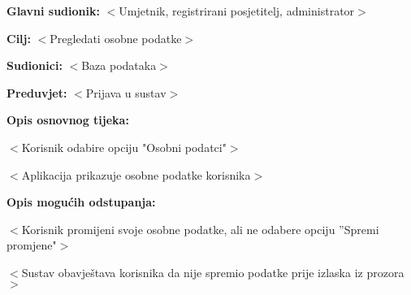 						\noindent {}
						\begin{packed_item}
							
							\item \textbf{Glavni sudionik: }$<$Umjetnik, registrirani posjetitelj, administrator$>$
							\item  \textbf{Cilj:} $<$Pregledati osobne podatke$>$
							\item  \textbf{Sudionici:} $<$Baza podataka$>$
							\item  \textbf{Preduvjet:} $<$Prijava u sustav$>$
							\item  \textbf{Opis osnovnog tijeka:}
							
							\item[] \begin{packed_enum}
								
								\item $<$Korisnik odabire opciju "Osobni podatci"$>$
								\item $<$Aplikacija prikazuje osobne podatke korisnika$>$						
							\end{packed_enum}
							
							\item  \textbf{Opis mogućih odstupanja:}
							
							\item[] \begin{packed_item}
								
								\item[2.a] $<$Korisnik promijeni svoje osobne podatke, ali ne odabere opciju ”Spremi promjene"$>$
								\item[] \begin{packed_enum}
									
									\item $<$Sustav obavještava korisnika da nije spremio podatke prije izlaska iz prozora$>$							
									
								\end{packed_enum}						
								
							\end{packed_item}
						\end{packed_item}
				
